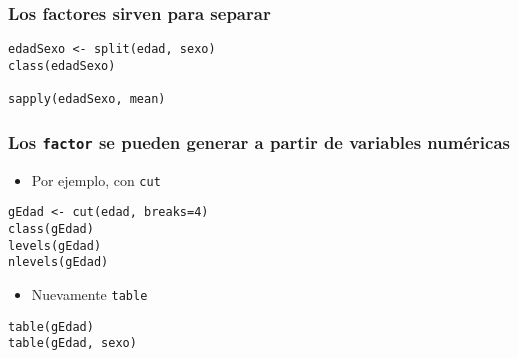 \documentclass[xcolor={usenames,svgnames,dvipsnames}]{beamer}
\begin{document}
\begin{frame}[fragile]
\frametitle{Los factores sirven para separar}
\label{sec-5-1-4}


\lstset{language=R}
\begin{lstlisting}
edadSexo <- split(edad, sexo)
class(edadSexo)

sapply(edadSexo, mean)
\end{lstlisting}
\end{frame}
\begin{frame}[fragile]
\frametitle{Los \texttt{factor} se pueden generar a partir de variables numéricas}
\label{sec-5-1-5}

\begin{itemize}
\item Por ejemplo, con \texttt{cut}
\end{itemize}

\lstset{language=R}
\begin{lstlisting}
gEdad <- cut(edad, breaks=4)
class(gEdad)
levels(gEdad)
nlevels(gEdad)
\end{lstlisting}

\begin{itemize}
\item Nuevamente \texttt{table}
\end{itemize}

\lstset{language=R}
\begin{lstlisting}
table(gEdad)
table(gEdad, sexo)
\end{lstlisting}
\end{frame}
\end{document}
